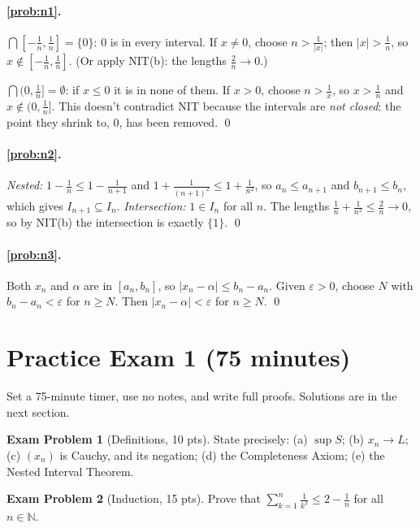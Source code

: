 \documentclass[11pt]{article}
\theoremstyle{definition}
\newtheorem{mprob}{Exam Problem}
\newcommand{\N}{\mathbb{N}}
\newcommand{\eps}{\varepsilon}
\begin{document}
\paragraph{\ref{prob:n1}.} $\bigcap[-\frac1n,\frac1n]=\{0\}$: $0$ is in
every interval. If $x\ne0$, choose $n>\frac1{|x|}$; then $|x|>\frac1n$,
so $x\notin[-\frac1n,\frac1n]$. (Or apply NIT(b): the lengths $\frac2n\to0$.)

$\bigcap(0,\frac1n]=\emptyset$: if $x\le0$ it is in none of them. If
$x>0$, choose $n>\frac1x$, so $x>\frac1n$ and $x\notin(0,\frac1n]$.
This doesn't contradict NIT because the intervals are \emph{not closed}:
the point they shrink to, $0$, has been removed. \qed

\paragraph{\ref{prob:n2}.} \emph{Nested:} $1-\frac1n\le1-\frac1{n+1}$ and
$1+\frac1{(n+1)^2}\le1+\frac1{n^2}$, so $a_n\le a_{n+1}$ and
$b_{n+1}\le b_n$, which gives $I_{n+1}\subseteq I_n$. \emph{Intersection:} $1\in I_n$
for all $n$. The lengths $\frac1n+\frac1{n^2}\le\frac2n\to0$, so by
NIT(b) the intersection is exactly $\{1\}$. \qed

\paragraph{\ref{prob:n3}.} Both $x_n$ and $\alpha$ are in $[a_n,b_n]$, so
$|x_n-\alpha|\le b_n-a_n$. Given $\eps>0$, choose $N$ with
$b_n-a_n<\eps$ for $n\ge N$. Then $|x_n-\alpha|<\eps$ for $n\ge N$. \qed

\newpage
\section{Practice Exam 1 (75 minutes)}
\label{sec:mock}
Set a 75-minute timer, use no notes, and write full proofs. Solutions are
in the next section.

\begin{mprob}[Definitions, 10 pts]
State precisely: (a) $\sup S$; (b) $x_n\to L$; (c) $(x_n)$ is Cauchy, and
its negation; (d) the Completeness Axiom; (e) the Nested Interval Theorem.
\end{mprob}

\begin{mprob}[Induction, 15 pts]
Prove that $\displaystyle\sum_{k=1}^n\frac1{k^2}\le2-\frac1n$ for all
$n\in\N$.
\end{mprob}
\end{document}
